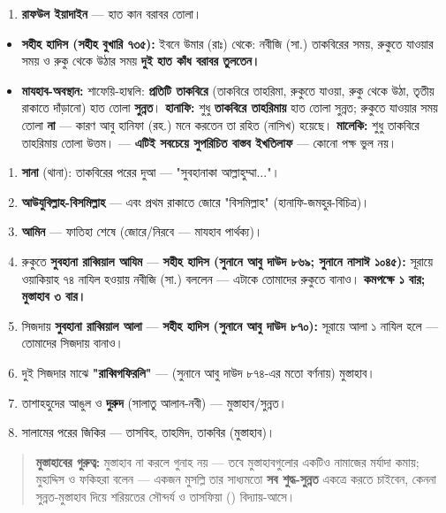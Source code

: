 \begin{enumerate}
\item \textbf{রাফউল ইয়াদাইন} — হাত কান বরাবর তোলা।
\end{enumerate}
\begin{itemize}
\item \textbf{সহীহ হাদিস (সহীহ বুখারি ৭৩৫):} ইবনে উমার (রাঃ) থেকে: নবীজি (সা.) তাকবিরের সময়, রুকুতে যাওয়ার সময় ও রুকু থেকে উঠার সময় \textbf{দুই হাত কাঁধ বরাবর তুলতেন।}
\item \textbf{মাযহাব-অবস্থান:} শাফেয়ি-হাম্বলি: \textbf{প্রতিটি তাকবিরে} (তাকবিরে তাহরিমা, রুকুতে যাওয়া, রুকু থেকে উঠা, তৃতীয় রাকাতে দাঁড়ানো) হাত তোলা \textbf{সুন্নত}। \textbf{হানাফি:} শুধু \textbf{তাকবিরে তাহরিমায়} হাত তোলা সুন্নত; রুকুতে যাওয়ার সময় তোলা \textbf{না} — কারণ আবু হানিফা (রহ.) মনে করতেন তা রহিত (নাসিখ) হয়েছে। \textbf{মালেকি:} শুধু তাকবিরে তাহরিমায় তোলা উত্তম। — \textbf{এটিই সবচেয়ে সুপরিচিত বাস্তব ইখতিলাফ} — কোনো পক্ষ ভুল নয়।
\end{itemize}
\begin{enumerate}
\item \textbf{সানা} (থানা): তাকবিরের পরের দুআ — "সুবহানাকা আল্লাহুম্মা..."।
\item \textbf{আউযুবিল্লাহ-বিসমিল্লাহ} — এবং প্রথম রাকাতে জোরে "বিসমিল্লাহ" (হানাফি-জমহুর-বিচিত্র)।
\item \textbf{আমিন} — ফাতিহা শেষে (জোরে/নিরবে — মাযহাব পার্থক্য)।
\item রুকুতে \textbf{সুবহানা রাব্বিয়াল আযিম} — \textbf{সহীহ হাদিস (সুনানে আবু দাউদ ৮৬৯; সুনানে নাসাঈ ১০৪৫):} সূরায়ে ওয়াকিয়াহ ৭৪ নাযিল হওয়ায় নবীজি (সা.) বললেন — এটাকে তোমাদের রুকুতে বানাও। \textbf{কমপক্ষে ১ বার; মুস্তাহাব ৩ বার।}
\item সিজদায় \textbf{সুবহানা রাব্বিয়াল আলা} — \textbf{সহীহ হাদিস (সুনানে আবু দাউদ ৮৭০):} সূরায়ে আলা ১ নাযিল হলে — তোমাদের সিজদায় বানাও।
\item দুই সিজদার মাঝে \textbf{"রাব্বিগফিরলি"} — (সুনানে আবু দাউদ ৮৭৪-এর মতো বর্ণনায়) মুস্তাহাব।
\item তাশাহহুদের আঙুল ও \textbf{দুরুদ} (সালাতু আলান-নবী) — মুস্তাহাব/সুন্নত।
\item সালামের পরের জিকির — তাসবিহ, তাহমিদ, তাকবির (মুস্তাহাব)।
\end{enumerate}
\begin{quote}
\textbf{মুস্তাহাবের গুরুত্ব:} মুস্তাহাব না করলে গুনাহ নয় — তবে মুস্তাহাবগুলোর একটিও নামাজের মর্যাদা কমায়; মুহাদ্দিস ও ফকিহরা বলেন — একজন মুসল্লি তার সাধ্যমতো \textbf{সব শুদ্ধ-সুন্নত} একত্রে করতে চাইবেন, কেননা সুন্নত-মুস্তাহাব দিয়ে শরিয়তের সৌন্দর্য ও তাসফিয়া () বিদ্যায়-আসে।
\end{quote}


